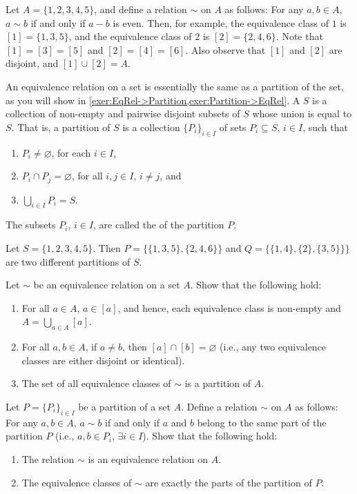 \begin{Example}
Let $A = \{1, 2, 3, 4, 5\}$, and define a relation $\sim$ on $A$ as follows: For any $a, b \in A$, $a \sim b$ if and only if $a - b$ is even. Then, for example, the equivalence class of $1$ is $[1] = \{1, 3, 5\}$, and the equivalence class of $2$ is $[2] = \{2, 4, 6\}$. Note that $[1] = [3] = [5]$ and $[2] = [4] = [6]$. Also observe that $[1]$ and $[2]$ are disjoint, and $[1] \cup [2] = A$.
\end{Example}

An equivalence relation on a set is essentially the same as a partition of the set, as you will show in \cref{exer:EqRel->Partition,exer:Partition->EqRel}. A  $S$ is a collection of non-empty and pairwise disjoint subsets of $S$ whose union is equal to $S$. That is, a partition of $S$ is a collection $\{P_i\}_{i \in I}$ of sets $P_i \subseteq S$, $i \in I$, such that
\begin{enumerate}
\item $P_i \ne \varnothing$, for each $i \in I$,
\item $P_i \cap P_j = \varnothing$, for all $i, j \in I$, $i \ne j$, and
\item $\bigcup_{i \in I} P_i = S$.
\end{enumerate}
The subsets $P_i$, $i \in I$, are called the  of the partition $P$.

\begin{Example}
Let $S = \{1, 2, 3, 4, 5\}$. Then $P = \{\{1, 3, 5\}, \{2, 4, 6\}\}$ and $Q = \{\{1, 4\}, \{2\}, \{3, 5\}\}\}$ are two different partitions of $S$.
\end{Example}

\begin{Exercise}\label{exer:EqRel->Partition}
Let $\sim$ be an equivalence relation on a set $A$. Show that the following hold:
\begin{enumerate}
\item For all $a \in A$, $a \in [a]$, and hence, each equivalence class is non-empty and $A = \bigcup_{a \in A} [a]$.
\item For all $a, b \in A$, if $a \ne b$, then $[a] \cap [b] = \varnothing$ (i.e., any two equivalence classes are either disjoint or identical).
\item The set of all equivalence classes of $\sim$ is a partition of $A$.
\end{enumerate}
\end{Exercise}

\begin{Exercise}\label{exer:Partition->EqRel}
Let $P = \{P_i\}_{i \in I}$ be a partition of a set $A$. Define a relation $\sim$ on $A$ as follows: For any $a, b \in A$, $a \sim b$ if and only if $a$ and $b$ belong to the same part of the partition $P$ (i.e., $a, b \in P_i$, $\exists i \in I$). Show that the following hold:
\begin{enumerate}
\item The relation $\sim$ is an equivalence relation on $A$.
\item The equivalence classes of $\sim$ are exactly the parts of the partition of $P$.
\end{enumerate}
\end{Exercise}

